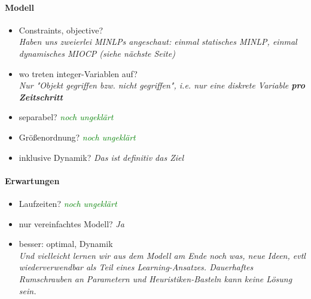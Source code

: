 \documentclass{article}
\begin{document}
\paragraph{Modell}
\begin{itemize}
\item Constraints, objective?\\
\textit{Haben uns zweierlei MINLPs angeschaut: einmal statisches MINLP, einmal dynamisches MIOCP (siehe n\"achste Seite)}
\item wo treten integer-Variablen auf?\\
\textit{Nur "Objekt gegriffen bzw. nicht gegriffen", i.e. nur eine diskrete Variable \textbf{pro Zeitschritt}}
\item separabel? 
\textcolor{green}{\textit{noch ungekl\"art}}
\item Gr\"o\ss{}enordnung?
\textcolor{green}{\textit{noch ungekl\"art}}
\item inklusive Dynamik?
\textit{Das ist definitiv das Ziel}
\end{itemize}

\paragraph{Erwartungen}
\begin{itemize}
\item Laufzeiten?
\textcolor{green}{\textit{noch ungekl\"art}}
\item nur vereinfachtes Modell?
\textit{Ja}
\item besser: optimal, Dynamik\\
\textit{Und vielleicht lernen wir aus dem Modell am Ende noch was, neue Ideen, evtl wiederverwendbar als Teil eines Learning-Ansatzes. Dauerhaftes Rumschrauben an Parametern und Heuristiken-Basteln kann keine L\"osung sein.}
\end{itemize}


\newpage
\end{document}

